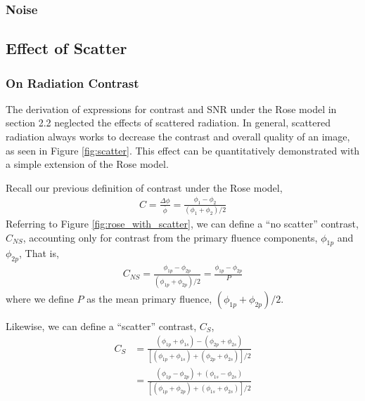 \documentclass[mphy386-notes.tex]{subfiles}
\begin{document}
\subsubsection{Noise}
\subsection{Effect of Scatter}


\subsubsection{On Radiation Contrast}

The derivation of expressions for contrast and SNR under the Rose model in
section 2.2 neglected the effects of scattered radiation. In general,
scattered radiation always works to decrease the contrast and overall
quality of an image, as seen in Figure \ref{fig:scatter}.
This effect can be quantitatively demonstrated with a simple extension
of the Rose model. 


Recall our previous definition of contrast under the Rose model,
\begin{align}
  C = \frac{\Delta \phi}{\bar{\phi}} = \frac{\phi_1 - \phi_2}{(\phi_1 + \phi_2)/2}
\end{align}
Referring to Figure \ref{fig:rose_with_scatter}, we can define a
``no scatter'' contrast, $C_{NS}$, accounting only for contrast from
the primary fluence components, $\phi_{1p}$ and $\phi_{2p}$, That is,
\begin{align}
  C_{NS} = \frac{\phi_{1p} - \phi_{2p}}{(\phi_{1p} + \phi_{2p})/2} = \frac{\phi_{1p} - \phi_{2p}}{P}
\end{align}
where we define $P$ as the mean primary fluence, $(\phi_{1p} + \phi_{2p})/2$.

Likewise, we can define a ``scatter'' contrast, $C_S$,
\begin{align}
  C_S &= \frac{(\phi_{1p} + \phi_{1s}) - (\phi_{2p} + \phi_{2s})}{[(\phi_{1p} + \phi_{1s}) + (\phi_{2p} + \phi_{2s})]/2}\\
      &= \frac{(\phi_{1p} - \phi_{2p}) + (\phi_{1s} - \phi_{2s})}{[(\phi_{1p} + \phi_{2p}) + (\phi_{1s} + \phi_{2s})]/2}\\
\end{align}
\end{document}

